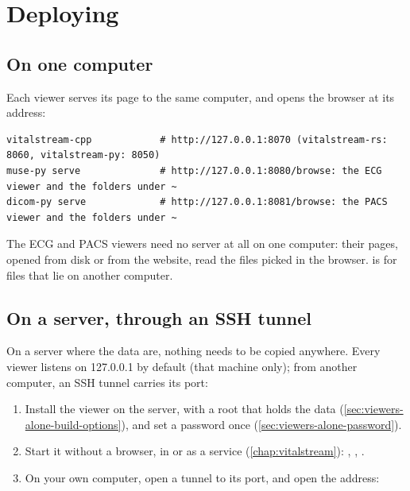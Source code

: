 \section{Deploying}
\label{sec:viewers-alone-deploy}

\subsection{On one computer}

Each viewer serves its page to the same computer, and opens the browser at its address:

\begin{lstlisting}[style=shell]
vitalstream-cpp            # http://127.0.0.1:8070 (vitalstream-rs: 8060, vitalstream-py: 8050)
muse-py serve              # http://127.0.0.1:8080/browse: the ECG viewer and the folders under ~
dicom-py serve             # http://127.0.0.1:8081/browse: the PACS viewer and the folders under ~
\end{lstlisting}

The ECG and PACS viewers need no server at all on one computer: their pages, opened from disk or
from the website, read the files picked in the browser.  is for files that lie on
another computer.

\subsection{On a server, through an SSH tunnel}
\label{sec:viewers-alone-server}

On a server where the data are, nothing needs to be copied anywhere. Every viewer listens on
127.0.0.1 by default (that machine only); from another computer, an SSH tunnel carries its port:
\begin{enumerate}
\item Install the viewer on the server, with a root that holds the data
  (\cref{sec:viewers-alone-build-options}), and set a password once
  (\cref{sec:viewers-alone-password}).
\item Start it without a browser, in  or as a service (\cref{chap:vitalstream}):
  , ,
  .
\item On your own computer, open a tunnel to its port, and open the address:
\end{enumerate}

